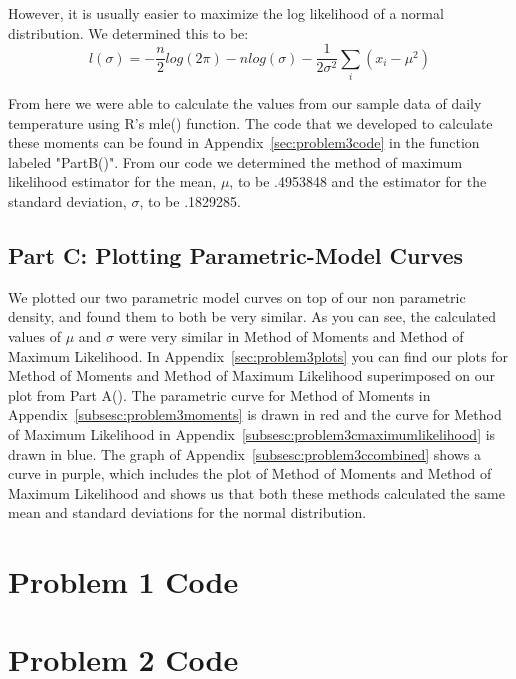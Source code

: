 \documentclass[11pt]{article}
\begin{document}
However, it is usually easier to maximize the log likelihood of a normal distribution. We determined this to be:
\begin{equation}
l(\sigma) = -\frac{n}{2}log(2\pi) - nlog(\sigma) - \frac{1}{2\sigma^{2}}\sum_{i}(x_i-\mu^2)
\end{equation} 

From here we were able to calculate the values from our sample data of daily temperature using R's mle() function. The code that we developed to calculate these moments can be found in Appendix~\ref{sec:problem3code} in the function labeled "PartB()". From our code we determined the method of maximum likelihood estimator for the mean, $\mu$, to be .4953848 and the estimator for the standard deviation, $\sigma$, to be .1829285. 



\subsection{Part C: Plotting Parametric-Model Curves}
\label{subsec:3c}
We plotted our two parametric model curves on top of our non parametric density, and found them to both be very similar. As you can see, the calculated values of $\mu$ and $\sigma$ were very similar in Method of Moments and Method of Maximum Likelihood. In Appendix~\ref{sec:problem3plots} you can find our plots for Method of Moments and Method of Maximum Likelihood superimposed on our plot from Part A(). The parametric curve for Method of Moments in Appendix~\ref{subsesc:problem3moments} is drawn in red and the curve for Method of Maximum Likelihood in Appendix~\ref{subsesc:problem3cmaximumlikelihood}  is drawn in blue. The graph of Appendix~\ref{subsesc:problem3ccombined} shows a curve in purple, which includes the plot of Method of Moments and Method of Maximum Likelihood and shows us that both these methods calculated the same mean and standard deviations for the normal distribution.

\pagebreak

\appendix
\section{Problem 1 Code}
\label{sec:problem1code}

\pagebreak

\section{Problem 2 Code}
\label{sec:problem2code}

\pagebreak
\end{document}
